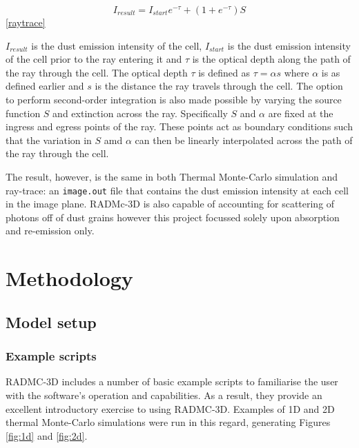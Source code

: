 \documentclass{report}
\begin{document}
\begin{equation}
  I_{result} = I_{start}e^{-\tau}+(1+e^{-\tau})S
\end{equation}\ref{raytrace}

$I_{result}$ is the dust emission intensity of the cell, $I_{start}$ is the dust emission intensity of the cell prior to the ray entering it and $\tau$ is the optical depth along the path of the ray through the cell. The optical depth $\tau$ is defined as $\tau = \alpha s$ where $\alpha$ is as defined earlier and $s$ is the distance the ray travels through the cell. The option to perform second-order integration is also made possible by varying the source function $S$ and extinction across the ray. Specifically $S$ and $\alpha$ are fixed at the ingress and egress points of the ray. These points act as boundary conditions such that the variation in $S$ amd $\alpha$ can then be linearly interpolated across the path of the ray through the cell.

The result, however, is the same in both Thermal Monte-Carlo simulation and ray-trace: an \texttt{image.out} file that contains the dust emission intensity at each cell in the image plane. RADMc-3D is also capable of accounting for scattering of photons off of dust grains however this project focussed solely upon absorption and re-emission only.

\chapter{Methodology}

\section{Model setup}

\subsection{Example scripts}
RADMC-3D includes a number of basic example scripts to familiarise the user with the software's operation and capabilities. As a result, they provide an excellent introductory exercise to using RADMC-3D. Examples of 1D and 2D thermal Monte-Carlo simulations were run in this regard, generating Figures \ref{fig:1d} and \ref{fig:2d}.
\end{document}
